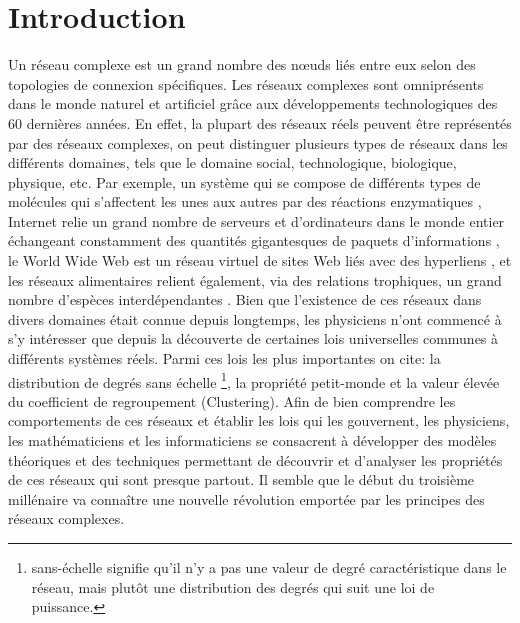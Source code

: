
	\newcommand{\nl}{$n_{\hat{\ell}}$ }
\chapter*{Introduction}
Un réseau complexe est un grand nombre des nœuds liés entre eux selon des topologies de connexion spécifiques. Les réseaux complexes sont omniprésents dans le monde naturel et artificiel grâce aux développements technologiques des $60$ dernières années. En effet,  la plupart des réseaux réels peuvent être représentés par des réseaux complexes, on peut distinguer plusieurs types de réseaux dans les différents domaines, tels que le domaine social, technologique, biologique, physique, etc. Par exemple, un système qui se compose de différents types de molécules qui s'affectent les unes aux autres par des réactions enzymatiques \cite{Je-al2000}, Internet  relie un grand nombre de serveurs et d'ordinateurs dans le monde entier échangeant constamment des quantités gigantesques de paquets d'informations \cite{F-al1999}, le World Wide Web est un réseau virtuel de sites Web liés avec des hyperliens \cite{BA1999}, et les réseaux alimentaires relient également, via des relations trophiques, un grand nombre d'espèces interdépendantes \cite{Co-al1990,Pim-al2002}. Bien que l'existence de ces réseaux dans divers domaines était connue depuis longtemps, les physiciens n'ont commencé à s'y intéresser que depuis la découverte de certaines lois universelles communes à différents systèmes réels. Parmi ces lois les plus importantes on cite: 
\textsf{la distribution de degrés} sans échelle \footnote{ sans-échelle signifie qu'il n'y a pas une valeur de degré caractéristique dans le réseau, mais plutôt une distribution des degrés qui suit une loi de puissance.},
la propriété \textsf{petit-monde}  
et la valeur élevée du \textsf{coefficient de regroupement} (Clustering). Afin de bien comprendre les comportements de ces réseaux et établir les lois qui les gouvernent, les physiciens, les mathématiciens et les informaticiens se consacrent à développer des modèles théoriques et des techniques permettant de découvrir  et d'analyser les propriétés de ces réseaux qui sont presque partout. Il semble que le début du troisième millénaire va connaître une nouvelle révolution emportée par les principes des réseaux complexes.\\

